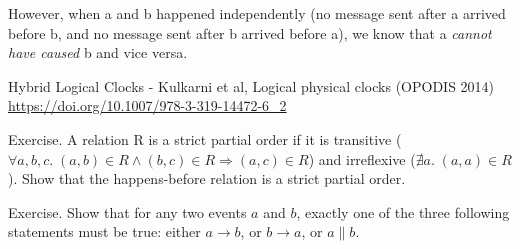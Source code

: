 However, when a and b happened independently (no message sent after a arrived before b, and no message sent after b arrived before a), we know that a \emph{cannot have caused} b and vice versa.

Hybrid Logical Clocks - Kulkarni et al, Logical physical clocks (OPODIS 2014) \url{https://doi.org/10.1007/978-3-319-14472-6_2}

Exercise. A relation R is a strict partial order if it is transitive ($\forall a,b,c.\; (a,b) \in R \wedge (b,c) \in R \Longrightarrow (a,c) \in R$) and irreflexive ($\nexists a.\; (a,a) \in R$). Show that the happens-before relation is a strict partial order.

Exercise. Show that for any two events $a$ and $b$, exactly one of the three following statements must be true: either $a \rightarrow b$, or $b \rightarrow a$, or $a \parallel b$.








{}

